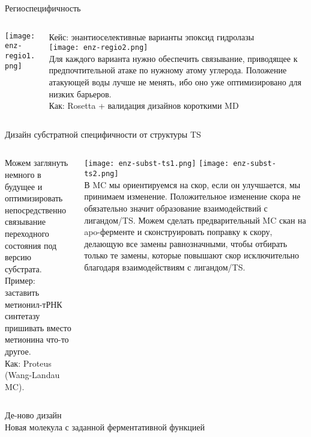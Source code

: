 \begin{frame}{Региоспецифичность}
\begin{columns}
\begin{column}{0.3\textwidth}
    \texttt{[image: enz-regio1.png]}
\end{column}
\begin{column}{0.7\textwidth}
    Кейс: энантиоселективные варианты эпоксид гидролазы \\
    \texttt{[image: enz-regio2.png]}\\
    Для каждого варианта нужно обеспечить связывание, приводящее к предпочтительной атаке по нужному атому углерода. Положение атакующей воды лучше не
    менять, ибо оно уже оптимизировано для низких барьеров.\\
Как: Rosetta + валидация дизайнов короткими MD 
\end{column}
\end{columns}
\end{frame}


\begin{frame}{Дизайн субстратной специфичности от структуры TS}
\begin{columns}
\begin{column}{0.5\textwidth}
    Можем заглянуть немного в будущее
и оптимизировать непосредственно связывание переходного состояния
под версию субстрата. \\
Пример: заставить метионил-тРНК синтетазу пришивать вместо метионина что-то другое. \\
Как: Proteus (Wang-Landau MC). 
\end{column}
\begin{column}{0.5\textwidth}
    \texttt{[image: enz-subst-ts1.png]}
    \texttt{[image: enz-subst-ts2.png]}\\
    \footnotesize  В MC мы ориентируемся на скор, если он улучшается, мы принимаем изменение. Положительное изменение скора не обязательно значит
    образование взаимодействий с лигандом/TS. Можем сделать предварительный MC скан на apo-ферменте и сконструировать поправку к скору, делающую все
    замены равнозначными, чтобы отбирать только те замены, которые повышают скор исключительно благодаря взаимодействиям с лигандом/TS.
\end{column}
\end{columns}
\end{frame}

\begin{frame}[plain]
    \centering
    \Huge{Де-ново дизайн}\\
    \Large{Новая молекула с заданной ферментативной функцией}
\end{frame}

